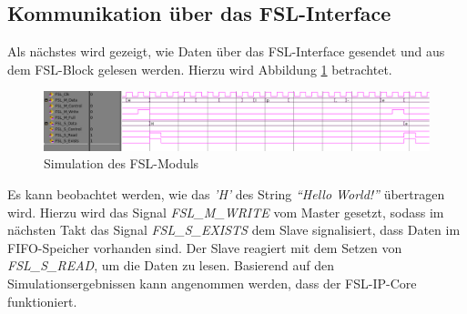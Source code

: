 \subsection{Kommunikation über das FSL-Interface}
Als nächstes wird gezeigt, wie Daten über das FSL-Interface gesendet und aus dem FSL-Block gelesen werden. Hierzu wird Abbildung \ref{fig:FSL_SIM} betrachtet.
\begin{figure}[th!]
\centering
\includegraphics[width=1\linewidth]{./bilder/FSL_SIM}
\caption{Simulation des FSL-Moduls}
\label{fig:FSL_SIM}
\end{figure}
Es kann beobachtet werden, wie das \textit{'H'} des String \textit{``Hello World!''} übertragen wird. Hierzu wird das Signal \textit{FSL\_M\_WRITE} vom Master gesetzt, sodass im nächsten Takt das Signal \textit{FSL\_S\_EXISTS} dem Slave signalisiert, dass Daten im FIFO-Speicher vorhanden sind. Der Slave reagiert mit dem Setzen von \textit{FSL\_S\_READ}, um die Daten zu lesen. Basierend auf den Simulationsergebnissen kann angenommen werden, dass der FSL-IP-Core funktioniert.

